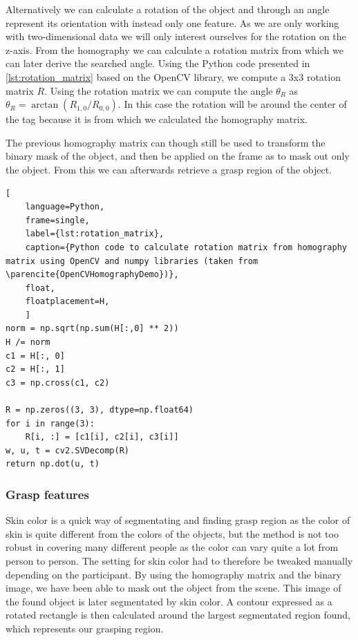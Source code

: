 Alternatively we can calculate a rotation of the object and through an angle represent its orientation with instead only one feature. As we are only working with two-dimensional data we will only interest ourselves for the rotation on the z-axis. From the homography we can calculate a rotation matrix from which we can later derive the searched angle. Using the Python code presented in \ref{lst:rotation_matrix} based on the OpenCV library, we compute a 3x3 rotation matrix \(R\). Using the rotation matrix we can compute the angle \(\theta_R\) as \(\theta_R = \arctan(R_{1,0} / R_{0,0})\). In this case the rotation will be around the center of the tag because it is from which we calculated the homography matrix.

The previous homography matrix can though still be used to transform the binary mask of the object, and then be applied on the frame as to mask out only the object. From this we can afterwards retrieve a grasp region of the object.

\begin{lstlisting}[
	language=Python,
	frame=single,
	label={lst:rotation_matrix},
	caption={Python code to calculate rotation matrix from homography matrix using OpenCV and numpy libraries (taken from \parencite{OpenCVHomographyDemo})},
	float,
	floatplacement=H,
	]
norm = np.sqrt(np.sum(H[:,0] ** 2))
H /= norm
c1 = H[:, 0]
c2 = H[:, 1]
c3 = np.cross(c1, c2)

R = np.zeros((3, 3), dtype=np.float64)
for i in range(3):
	R[i, :] = [c1[i], c2[i], c3[i]]
w, u, t = cv2.SVDecomp(R)
return np.dot(u, t)
\end{lstlisting}

\subsubsection{Grasp features}

Skin color is a quick way of segmentating and finding grasp region as the color of skin is quite different from the colors of the objects, but the method is not too robust in covering many different people as the color can vary quite a lot from person to person. The setting for skin color had to therefore be tweaked manually depending on the participant. By using the homography matrix and the binary image, we have been able to mask out the object from the scene. This image of the found object is later segmentated by skin color. A contour expressed as a rotated rectangle is then calculated around the largest segmentated region found, which represents our grasping region.

